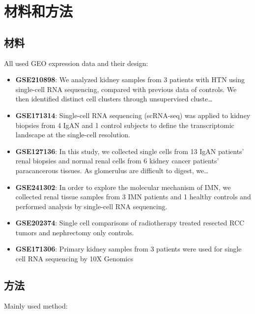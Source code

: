 \documentclass[
]{article}
\begin{document}
\hypertarget{methods}{%
\section{材料和方法}\label{methods}}

\hypertarget{ux6750ux6599}{%
\subsection{材料}\label{ux6750ux6599}}

All used GEO expression data and their design:

\begin{itemize}
\item
  \textbf{GSE210898}: We analyzed kidney samples from 3 patients with HTN using single-cell RNA sequencing, compared with previous data of controls. We then identified distinct cell clusters through unsupervised cluste\ldots{}
\item
  \textbf{GSE171314}: Single-cell RNA sequencing (scRNA-seq) was applied to kidney biopsies from 4 IgAN and 1 control subjects to define the transcriptomic landscape at the single-cell resolution.
\item
  \textbf{GSE127136}: In this study, we collected single cells from 13 IgAN patients' renal biopsies and normal renal cells from 6 kidney cancer patients' paracancerous tissues. As glomerulus are difficult to digest, we\ldots{}
\item
  \textbf{GSE241302}: In order to explore the molecular mechanism of IMN, we collected renal tissue samples from 3 IMN patients and 1 healthy controls and performed analysis by single-cell RNA sequencing.
\item
  \textbf{GSE202374}: Single cell comparisons of radiotherapy treated resected RCC tumors and nephrectomy only controls.
\item
  \textbf{GSE171306}: Primary kidney samples from 3 patients were used for single cell RNA sequencing by 10X Genomics
\end{itemize}

\hypertarget{ux65b9ux6cd5}{%
\subsection{方法}\label{ux65b9ux6cd5}}

Mainly used method:
\end{document}
